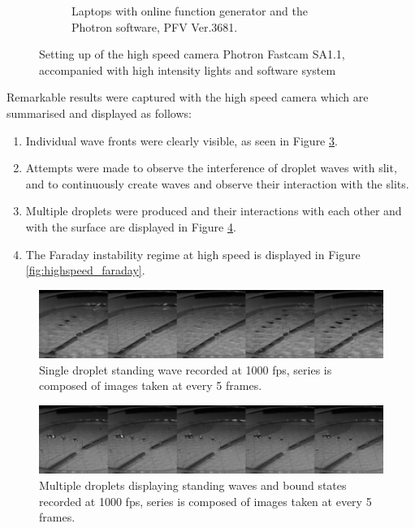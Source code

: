 \begin{figure}[ht]
\begin{subfigure}[t]{0.5\textwidth}
        \caption{Laptops with online function generator and the Photron software, PFV Ver.3681.}
        \label{fig:software_highspeedcamera}
    \end{subfigure}
\caption{Setting up of the high speed camera Photron Fastcam SA1.1, accompanied with high intensity lights and software system}
\label{fig:highspeed_setup}
\end{figure}

Remarkable results were captured with the high speed camera which are summarised and displayed as follows:
\begin{enumerate}
\item  Individual wave fronts were clearly visible, as seen in Figure \ref{fig:highspeed_wave}.
\item  Attempts were made to observe the interference of droplet waves with slit, and to continuously create waves and observe their interaction with  the slits.
\item  Multiple droplets were produced and their interactions with each  other and with the surface are displayed in Figure \ref{fig:highspeed_multiple}.
\item  The Faraday instability regime at high speed is displayed in  Figure \ref{fig:highspeed_faraday}.
\end{enumerate}

\begin{figure}[htb]
\includegraphics[width=\textwidth]{prototype/exp_rep_imgs/highspeed_wave.jpg}
\centering
\caption{Single droplet standing wave recorded at 1000 fps, series is composed of images taken at every 5 frames.}
\centering
\label{fig:highspeed_wave}
\end{figure}

\begin{figure}[htb]
\includegraphics[width=\textwidth]{prototype/exp_rep_imgs/highspeed_multiple.jpg}
\centering
\caption{Multiple droplets displaying standing waves and bound states recorded at 1000 fps, series is composed of images taken at every 5 frames.}
\centering
\label{fig:highspeed_multiple}
\end{figure}

